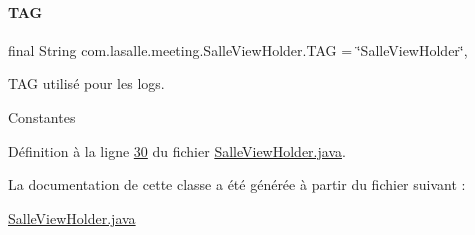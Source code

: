 \mbox{\label{classcom_1_1lasalle_1_1meeting_1_1_salle_view_holder_acde5b16df12d2d83074c53bbfe7220b9}} 
\paragraph{\texorpdfstring{T\+AG}{TAG}}
{\footnotesize\ttfamily final String com.\+lasalle.\+meeting.\+Salle\+View\+Holder.\+T\+AG = \char`\"{}Salle\+View\+Holder\char`\"{}\hspace{0.3cm}{\ttfamily [static]}, {\ttfamily [private]}}



T\+AG utilisé pour les logs. 

Constantes 

Définition à la ligne \hyperlink{_salle_view_holder_8java_source_l00030}{30} du fichier \hyperlink{_salle_view_holder_8java_source}{Salle\+View\+Holder.\+java}.



La documentation de cette classe a été générée à partir du fichier suivant \+:\begin{DoxyCompactItemize}
\item 
\hyperlink{_salle_view_holder_8java}{Salle\+View\+Holder.\+java}\end{DoxyCompactItemize}
